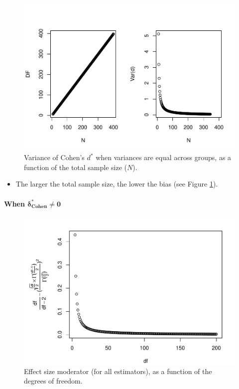 \documentclass[
  english,
  man,mask]{apa6}
\providecommand{\tightlist}{%
  \setlength{\itemsep}{0pt}\setlength{\parskip}{0pt}}
\let\oldparagraph\paragraph
\renewcommand{\paragraph}[1]{\oldparagraph{#1}\mbox{}}
\begin{document}
\begin{figure}
\centering
\includegraphics{Theoretical-Variance-of-all-estimators-as-a-function-of-population-parameters_files/figure-latex/varcohendprimehomNsize2-1.pdf}
\caption{\label{fig:varcohendprimehomNsize2}Variance of Cohen's \(d^*\) when variances are equal across groups, as a function of the total sample size (\(N\)).}
\end{figure}

\begin{itemize}
\tightlist
\item
  The larger the total sample size, the lower the bias (see Figure \ref{fig:varcohendprimehomNsize2}).
\end{itemize}

\hypertarget{when-bmdelta_cohen-neq-0}{%
\paragraph{\texorpdfstring{When \(\bm{\delta^*_{Cohen} \neq 0}\)}{When \textbackslash bm\{\textbackslash delta\^{}*\_\{Cohen\} \textbackslash neq 0\}}}\label{when-bmdelta_cohen-neq-0}}

\begin{figure}
\centering
\includegraphics{Theoretical-Variance-of-all-estimators-as-a-function-of-population-parameters_files/figure-latex/ESmoderator2-1.pdf}
\caption{\label{fig:ESmoderator2}Effect size moderator (for all estimators), as a function of the degrees of freedom.}
\end{figure}
\end{document}
